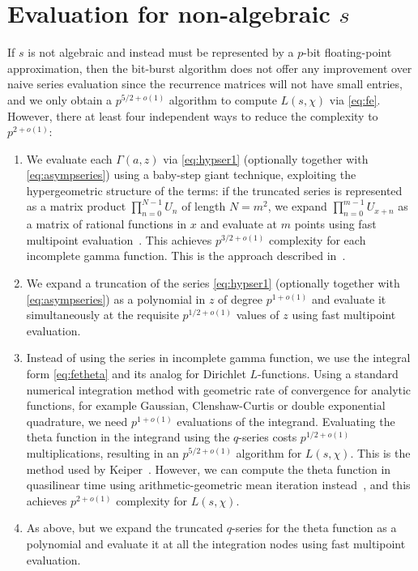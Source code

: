 \documentclass[reqno]{amsart}
\theoremstyle{definition}
\begin{document}

\section{Evaluation for non-algebraic $s$}

\label{sect:transcendental}

If $s$ is not algebraic and instead must be represented by a $p$-bit
floating-point approximation, then the bit-burst algorithm does not
offer any improvement over naive series evaluation since the recurrence
matrices will not have small entries,
and we only obtain a $p^{5/2+o(1)}$ algorithm to compute $L(s,\chi)$ via \eqref{eq:fe}.
However, there at least four independent ways to reduce the complexity to $p^{2+o(1)}$:

\begin{enumerate}
\item We evaluate each $\Gamma(a,z)$ via \eqref{eq:hypser1} (optionally together with \eqref{eq:asympseries})
using a baby-step giant technique, exploiting the hypergeometric structure
of the terms: if the truncated series
is represented as a matrix product $\prod_{n=0}^{N-1} U_n$ of length $N = m^2$,
we expand $\prod_{n=0}^{m-1} U_{x+n}$ as a matrix of rational functions in $x$
and evaluate at $m$ points using fast multipoint evaluation~\cite{Borwein1987}.
This achieves $p^{3/2+o(1)}$ complexity for each incomplete gamma function.
This is the approach described in~\cite{BorweinBradleyCrandall2000}.
\item We expand a truncation of the series \eqref{eq:hypser1} (optionally together with \eqref{eq:asympseries})
as a polynomial in $z$ of degree $p^{1+o(1)}$ and evaluate it simultaneously at the requisite
$p^{1/2+o(1)}$ values of $z$ using fast multipoint evaluation.
\item Instead of using the series in incomplete gamma function, we
use the integral form \eqref{eq:fetheta} and its analog for Dirichlet $L$-functions.
Using a standard numerical integration method with geometric
rate of convergence for analytic functions, for example Gaussian,
Clenshaw-Curtis or double exponential quadrature, we need $p^{1+o(1)}$
evaluations of the integrand.
Evaluating the theta function in the integrand using the $q$-series costs $p^{1/2+o(1)}$ multiplications,
resulting in an $p^{5/2+o(1)}$
algorithm for $L(s,\chi)$. This is the method used by Keiper~\cite{Keiper1992power}. However, we can compute the theta function in
quasilinear time using arithmetic-geometric mean iteration instead~\cite{labrande2018computing}, and this achieves $p^{2+o(1)}$ complexity for $L(s,\chi)$.
\item As above, but we expand the truncated $q$-series for the theta
function as a polynomial and evaluate it at all the integration
nodes using fast multipoint evaluation.
\end{enumerate}
\end{document}
